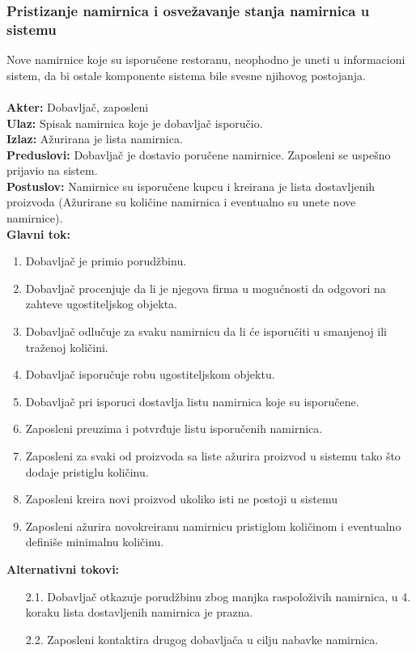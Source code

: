 \documentclass{article}
\begin{document}
\subsubsection{Pristizanje namirnica i osvežavanje stanja namirnica u sistemu}
Nove namirnice koje su isporučene restoranu, neophodno je uneti u informacioni sistem, da bi ostale komponente sistema bile svesne njihovog postojanja.\\\\
\textbf{Akter:} Dobavljač, zaposleni\\
\textbf{Ulaz:} Spisak namirnica koje je dobavljač isporučio.\\
\textbf{Izlaz:} Ažurirana je lista namirnica.\\
\textbf{Preduslovi:} Dobavljač je dostavio poručene namirnice. Zaposleni se uspešno prijavio na sistem. \\
\textbf{Postuslov:} Namirnice su isporučene kupcu i kreirana je lista dostavljenih proizvoda (Ažurirane su količine namirnica i eventualno su unete nove namirnice).\\
\textbf{Glavni tok:} 
\begin{enumerate}
	\item Dobavljač je primio porudžbinu.
	\item Dobavljač procenjuje da li je njegova firma u mogućnosti da odgovori na zahteve ugostiteljskog objekta.
	\item Dobavljač odlučuje za svaku namirnicu da li će isporučiti u smanjenoj ili traženoj količini.
	\item Dobavljač isporučuje robu ugostiteljskom objektu.
	\item Dobavljač pri isporuci dostavlja listu namirnica koje su isporučene.
    \item Zaposleni preuzima i potvrđuje listu isporučenih namirnica.
	\item Zaposleni za svaki od proizvoda sa liste ažurira proizvod u sistemu tako što dodaje pristiglu količinu.
	\item Zaposleni kreira novi proizvod ukoliko isti ne postoji u sistemu
	\item Zaposleni ažurira novokreiranu namirnicu pristiglom količinom i eventualno definiše minimalnu količinu. 
\end{enumerate}
\textbf{Alternativni tokovi:} 
\begin{itemize}
\item[2.1.] Dobavljač otkazuje porudžbinu zbog manjka raspoloživih namirnica, u 4. koraku lista dostavljenih namirnica je prazna.
\item[2.2.] Zaposleni kontaktira drugog dobavljača u cilju nabavke namirnica.
\end{itemize}
\end{document}
